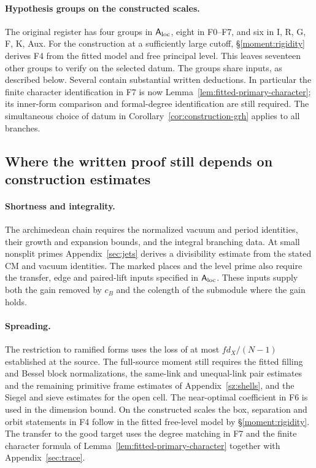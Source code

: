 \paragraph{Hypothesis groups on the constructed scales.}
The original register has four groups in $\mathsf A_{\rm loc}$, eight in
F0--F7, and six in I, R, G, F, K, Aux. For the construction at a sufficiently
large cutoff, \S\ref{moment:rigidity} derives F4 from the fitted model and
free principal level. This leaves seventeen other groups to verify on the
selected datum. The groups share inputs, as described below. Several contain substantial written deductions. In
particular the finite character identification in F7 is now
Lemma~\ref{lem:fitted-primary-character}; its inner-form comparison and
formal-degree identification are still required. The simultaneous choice
of datum in Corollary~\ref{cor:construction-grh} applies to all branches.

\subsection*{Where the written proof still depends on construction estimates}
\paragraph{Shortness and integrality.}
The archimedean chain requires the normalized vacuum and period identities,
their growth and expansion bounds, and the integral branching data. At
small nonsplit primes Appendix~\ref{sec:jets} derives a divisibility
estimate from the stated CM and vacuum identities. The marked places and
the level prime also require the transfer, edge and paired-lift inputs
specified in $\mathsf A_{\rm loc}$. These inputs supply both the gain
removed by $c_B$ and the colength of the submodule where the gain holds.

\paragraph{Spreading.}
The restriction to ramified forms uses the loss of at most
$f d_X/(N-1)$ established at the source. The full-source moment still
requires the fitted filling and Bessel block normalizations, the same-link
and unequal-link pair estimates and the remaining
primitive frame estimates of Appendix~\ref{sz:shells}, and the Siegel and
sieve estimates for the open cell. The near-optimal coefficient in F6 is
used in the dimension bound. On the constructed scales the box, separation and orbit statements in F4 follow in the fitted free-level model by \S\ref{moment:rigidity}. The transfer to the good target uses the
degree matching in F7 and the finite character formula of Lemma~\ref{lem:fitted-primary-character} together with Appendix~\ref{sec:trace}.

